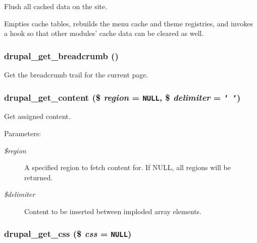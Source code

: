 Flush all cached data on the site.

Empties cache tables, rebuilds the menu cache and theme registries, and invokes a hook so that other modules' cache data can be cleared as well. \hypertarget{common_8inc_f1e9626192d1d2e5e63b370e88c03c7c}{
\subsubsection[{drupal\_\-get\_\-breadcrumb}]{\setlength{\rightskip}{0pt plus 5cm}drupal\_\-get\_\-breadcrumb ()}}
\label{common_8inc_f1e9626192d1d2e5e63b370e88c03c7c}


Get the breadcrumb trail for the current page. \hypertarget{common_8inc_57f11487017e5fb889f797456300fc4c}{
\subsubsection[{drupal\_\-get\_\-content}]{\setlength{\rightskip}{0pt plus 5cm}drupal\_\-get\_\-content (\$ {\em region} = {\tt NULL}, \/  \$ {\em delimiter} = {\tt '~'})}}
\label{common_8inc_57f11487017e5fb889f797456300fc4c}


Get assigned content.

\begin{Desc}
\item[Parameters:]
\begin{description}
\item[{\em \$region}]A specified region to fetch content for. If NULL, all regions will be returned. \item[{\em \$delimiter}]Content to be inserted between imploded array elements. \end{description}
\end{Desc}
\hypertarget{common_8inc_90f269c442c46417319a614057985a0c}{
\subsubsection[{drupal\_\-get\_\-css}]{\setlength{\rightskip}{0pt plus 5cm}drupal\_\-get\_\-css (\$ {\em css} = {\tt NULL})}}
\label{common_8inc_90f269c442c46417319a614057985a0c}


